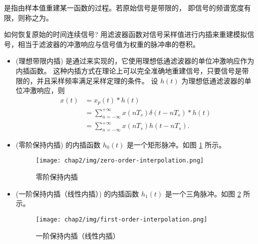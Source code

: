 \begin{definition}[内插]
    是指由样本值重建某一函数的过程。若原始信号是带限的，
    即信号的频谱宽度有限，则称之为。

    如何恢复原始的时间连续信号?
    用滤波器函数对信号采样值进行内插来重建模拟信号，相当于滤波器的冲激响应与信号值为权重的脉冲串的卷积。
    \begin{itemize}
        \item (理想带限内插)
            是通过来实现的，它使用理想低通滤波器的单位冲激响应作为内插函数。
            这种内插方式在理论上可以完全准确地重建信号，只要信号是带限的，并且采样频率满足采样定理的条件。
            设 $h(t)$ 为理想低通滤波器的单位冲激响应，则
            \begin{align*}
                x(t) & = x_p(t) * h(t) \\
                & = \sum_{n = -\infty}^{+\infty}x(nT_s)\delta(t - nT_s) * h(t) \\
                & = \sum_{n = -\infty}^{+\infty}x(nT_s)h(t - nT_s).
            \end{align*}
        \item (零阶保持内插)
            的内插函数 $h_0(t)$ 是一个矩形脉冲。如图 \ref{fig:zero-order-interpolation} 所示。
            \begin{figure}[H]
                \centering
                \texttt{[image: chap2/img/zero-order-interpolation.png]}
                \caption{零阶保持内插}
                \label{fig:zero-order-interpolation}
            \end{figure}
        \item (一阶保持内插（线性内插）)
            的内插函数 $h_1(t)$ 是一个三角脉冲。如图 \ref{fig:first-order-interpolation} 所示。
            \begin{figure}[H]
                \centering
                \texttt{[image: chap2/img/first-order-interpolation.png]}
                \caption{一阶保持内插（线性内插）}
                \label{fig:first-order-interpolation}
            \end{figure}
    \end{itemize}
\end{definition}

